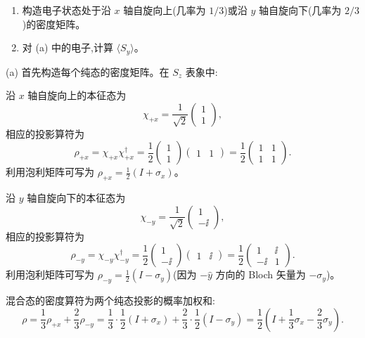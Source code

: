 \begin{question}
\begin{enumerate}
\item 构造电子状态处于沿 $x$ 轴自旋向上(几率为 $1/3$)或沿 $y$ 轴自旋向下(几率为 $2/3$)的密度矩阵。
\item 对 (a) 中的电子,计算 $\langle S_y\rangle$。
\end{enumerate}
\begin{solution}
(a) 首先构造每个纯态的密度矩阵。在 $S_z$ 表象中:

沿 $x$ 轴自旋向上的本征态为
\[
\chi_{+x} = \frac{1}{\sqrt{2}}\begin{pmatrix}1\\1\end{pmatrix},
\]
相应的投影算符为
\[
\rho_{+x} = \chi_{+x}\chi_{+x}^\dagger
= \frac{1}{2}\begin{pmatrix}1\\1\end{pmatrix}\begin{pmatrix}1&1\end{pmatrix}
= \frac{1}{2}\begin{pmatrix}1&1\\1&1\end{pmatrix}.
\]
利用泡利矩阵可写为 $\rho_{+x} = \frac{1}{2}(I+\sigma_x)$。

沿 $y$ 轴自旋向下的本征态为
\[
\chi_{-y} = \frac{1}{\sqrt{2}}\begin{pmatrix}1\\-\ii\end{pmatrix},
\]
相应的投影算符为
\[
\rho_{-y} = \chi_{-y}\chi_{-y}^\dagger
= \frac{1}{2}\begin{pmatrix}1\\-\ii\end{pmatrix}\begin{pmatrix}1&\ii\end{pmatrix}
= \frac{1}{2}\begin{pmatrix}1&\ii\\-\ii&1\end{pmatrix}.
\]
利用泡利矩阵可写为 $\rho_{-y} = \frac{1}{2}(I-\sigma_y)$(因为 $-\hat y$ 方向的 Bloch 矢量为 $-\sigma_y$)。

混合态的密度算符为两个纯态投影的概率加权和:
\[
\rho = \frac{1}{3}\rho_{+x} + \frac{2}{3}\rho_{-y}
= \frac{1}{3}\cdot\frac{1}{2}(I+\sigma_x) + \frac{2}{3}\cdot\frac{1}{2}(I-\sigma_y)
= \frac{1}{2}\left(I + \frac{1}{3}\sigma_x - \frac{2}{3}\sigma_y\right).
\]


\end{solution}
\end{question}
